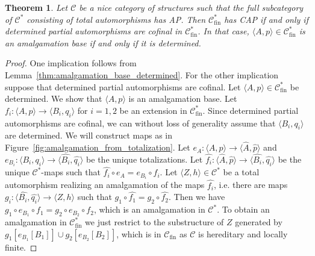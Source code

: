 \documentclass[oneside,notitlepage,12pt]{article}
\newtheorem{tw}{Theorem}[section]
\theoremstyle{definition}
\theoremstyle{remark}
\newcommand \seq [1]{\langle #1 \rangle}
\newcommand \maps {\colon} %
\newcommand \im [1]{[#1]} %
\newcommand \cmp {\circ} %
\newcommand \C {\mathscr{C}}
\newcommand \fin {{\operatorname{fin}}}
\begin{document}
\begin{tw} \label{thm:amalgamation_from_totalization}
    Let $\C$ be a nice category of structures such that the full subcategory of $\C^*$ consisting of total automorphisms has AP.
    Then $\C^*_\fin$ has CAP if and only if determined partial automorphisms are cofinal in $\C^*_\fin$.
    In that case, $\seq{A, p} \in \C^*_\fin$ is an amalgamation base if and only if it is determined.
\end{tw}
\begin{proof}
    One implication follows from Lemma~\ref{thm:amalgamation_base_determined}.
    For the other implication suppose that determined partial automorphisms are cofinal.
    Let $\seq{A, p} \in \C^*_\fin$ be determined. We show that $\seq{A, p}$ is an amalgamation base. 
    Let $f_i\maps \seq{A, p} \to \seq{B_i, q_i}$ for $i = 1, 2$ be an extension in $\C^*_\fin$.
    Since determined partial automorphisms are cofinal, we can without loss of generality assume that $\seq{B_i, q_i}$ are determined.
    We will construct maps as in Figure~\ref{fig:amalgamation_from_totalization}.
    Let $e_A\maps \seq{A, p} \to \seq{\hat{A}, \hat{p}}$ and $e_{B_i}\maps \seq{B_i, q_i} \to \seq{\hat{B_i}, \hat{q_i}}$ be the unique totalizations.
    Let $\hat{f_i}\maps \seq{\hat{A}, \hat{p}} \to \seq{\hat{B_i}, \hat{q_i}}$ be the unique $\C^*$-maps such that $\hat{f_i} \cmp e_A = e_{B_i} \cmp f_i$.
    Let $\seq{Z, h} \in \C^*$ be a total automorphism realizing an amalgamation of the maps $\hat{f_i}$, i.e. there are maps $g_i\maps \seq{\hat{B_i}, \hat{q_i}} \to \seq{Z, h}$ such that $g_1 \cmp \hat{f_1} = g_2 \cmp \hat{f_2}$.
    Then we have $g_1 \cmp e_{B_1} \cmp f_1 = g_2 \cmp e_{B_2} \cmp f_2$, which is an amalgamation in $\C^*$.
    To obtain an amalgamation in $\C_\fin^*$ we just restrict to the substructure of $Z$ generated by $g_1\im{e_{B_1}\im{B_1}} \cup g_2\im{e_{B_2}\im{B_2}}$, which is in $\C_\fin$ as $\C$ is hereditary and locally finite.
\end{proof}
\end{document}
